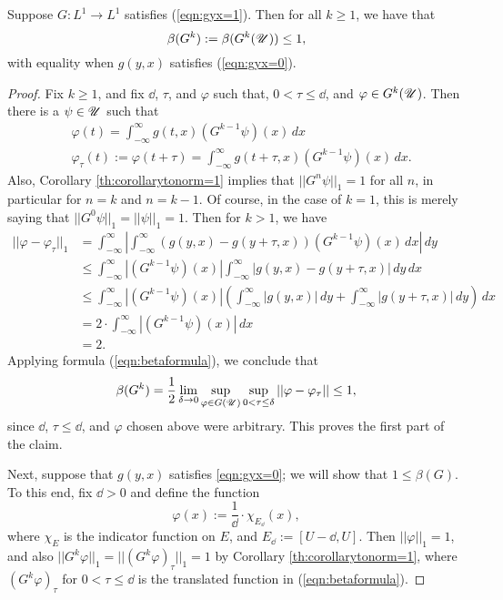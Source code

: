 \begin{lemma} \label{th:bgbounds}
	Suppose $G:L^1 \to L^1$ satisfies (\ref{eqn:gyx=1}). Then for all $k \geq 1$, we have that
	\[\beta(G^k):= \beta(G^k(\mathscr U)) \leq 1,\]
	with equality when $g(y,x)$ satisfies (\ref{eqn:gyx=0}).
\end{lemma}

\begin{proof}
	Fix $k \geq 1$, and fix $\dd$, $\tau$, and $\varphi$ such that, $0<\tau \leq \dd$, and $\varphi \in G^k(\mathscr U)$. Then there is a $\psi \in \mathscr U$ such that
	\begin{align*}
		&\varphi(t) = \int_{-\infty}^\infty g(t,x) (G^{k-1}\psi)(x) \, dx \\
		&\varphi_\tau(t) := \varphi(t+\tau) = \int_{-\infty}^\infty g(t+\tau, x) (G^{k-1}\psi)(x) \, dx.
	\end{align*}
	Also, Corollary \ref{th:corollarytonorm=1} implies that $||G^n \psi||_1 = 1$ for all $n$, in particular for $n = k$ and $n = k-1$. Of course, in the case of $k = 1$, this is merely saying that $||G^0\psi||_1 = ||\psi||_1 = 1$. Then for $k > 1$, we have
	\begin{align*}
		||\varphi-\varphi_\tau||_1 &= \int_{-\infty}^\infty \left| \int_{-\infty}^\infty (g(y,x) - g(y+\tau,x)) (G^{k-1}\psi)(x) \, dx \right| \, dy \\
		&\leq \int_{-\infty}^\infty |(G^{k-1}\psi)(x)| \int_{-\infty}^\infty |g(y,x)-g(y+\tau,x)| \, dy \, dx \\
		&\leq \int_{-\infty}^\infty |(G^{k-1}\psi)(x)| \left( \int_{-\infty}^\infty |g(y,x)| \, dy + \int_{-\infty}^\infty |g(y+\tau,x)| \, dy \right) \, dx \\
		&= 2 \cdot \int_{-\infty}^\infty |(G^{k-1}\psi)(x)| \, dx \\
		&= 2.
	\end{align*}
	Applying formula (\ref{eqn:betaformula}), we conclude that
	\[\beta(G^k) =\frac 12 \lim_{\delta \to 0} \sup_{\varphi \in G(\mathscr U)} \sup_{0<\tau \leq \delta} ||\varphi-\varphi_{\tau}|| \leq 1,\]
	since $\dd$, $\tau \leq \dd$, and $\varphi$ chosen above were arbitrary. This proves the first part of the claim.
	
	Next, suppose that $g(y,x)$ satisfies \ref{eqn:gyx=0}; we will show that $1 \leq \beta(G)$. To this end, fix $\dd>0$ and define the function
	\[\varphi(x) := \frac{1}{\dd} \cdot \chi_{E_\dd}(x),\]
	where $\chi_E$ is the indicator function on $E$, and $E_{\dd} := [U-\dd,U]$. Then $||\varphi||_1 = 1$, and also $||G^k\varphi||_1=||(G^k\varphi)_\tau||_1=1$ by Corollary \ref{th:corollarytonorm=1}, where $(G^k\varphi)_\tau$ for $0<\tau \leq \dd$ is the translated function in (\ref{eqn:betaformula}).
	

\end{proof}
